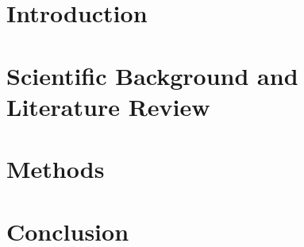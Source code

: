 \documentclass[a4paper,separatefrontmatter]{ustthesis}
\begin{document}
\chapter{Introduction}
\label{chp_intro}

\newpage

% 



\chapter{Scientific Background and Literature Review}
\label{chp_review}

\newpage

\chapter{Methods}
\label{chp_attack}

\newpage


\chapter{Conclusion}
\label{chp_conclusion}

\newpage

\end{document}
